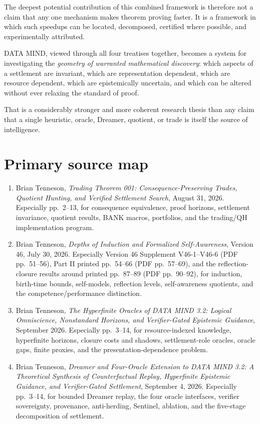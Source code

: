 \documentclass[11pt]{article}
\begin{document}
The deepest potential contribution of this combined framework is therefore not a claim that any one mechanism makes theorem proving faster. It is a framework in which such speedups can be located, decomposed, certified where possible, and experimentally attributed.

DATA MIND, viewed through all four treatises together, becomes a system for investigating the \emph{geometry of warranted mathematical discovery}: which aspects of a settlement are invariant, which are representation dependent, which are resource dependent, which are epistemically uncertain, and which can be altered without ever relaxing the standard of proof.

That is a considerably stronger and more coherent research thesis than any claim that a single heuristic, oracle, Dreamer, quotient, or trade is itself the source of intelligence.

\newpage
\section*{Primary source map}

\begin{enumerate}
\item Brian Tenneson, \emph{Trading Theorem 001: Consequence-Preserving Trades, Quotient Hunting, and Verified Settlement Search}, August 31, 2026. Especially pp.~2--13, for consequence equivalence, proof horizons, settlement invariance, quotient results, BANK macros, portfolios, and the trading/QH implementation program.

\item Brian Tenneson, \emph{Depths of Induction and Formalized Self-Awareness}, Version 46, July 30, 2026. Especially Version 46 Supplement V46-1--V46-6 (PDF pp.~51--56), Part II printed pp.~54--66 (PDF pp.~57--69), and the reflection-closure results around printed pp.~87--89 (PDF pp.~90--92), for induction, birth-time bounds, self-models, reflection levels, self-awareness quotients, and the competence/performance distinction.

\item Brian Tenneson, \emph{The Hyperfinite Oracles of DATA MIND 3.2: Logical Omniscience, Nonstandard Horizons, and Verifier-Gated Epistemic Guidance}, September 2026. Especially pp.~3--14, for resource-indexed knowledge, hyperfinite horizons, closure costs and shadows, settlement-role oracles, oracle gaps, finite proxies, and the presentation-dependence problem.

\item Brian Tenneson, \emph{Dreamer and Four-Oracle Extension to DATA MIND 3.2: A Theoretical Synthesis of Counterfactual Replay, Hyperfinite Epistemic Guidance, and Verifier-Gated Settlement}, September 4, 2026. Especially pp.~3--14, for bounded Dreamer replay, the four oracle interfaces, verifier sovereignty, provenance, anti-herding, Sentinel, ablation, and the five-stage decomposition of settlement.
\end{enumerate}
\end{document}
